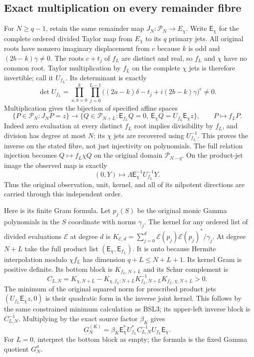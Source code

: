 \documentclass[11pt,a4paper]{article}
\begin{document}
\subsection{Exact multiplication on every remainder fibre}
For $N\geq q-1$, retain the same remainder map
$J_N:\mathcal P_N\to E_\chi$. Write $\mathsf E_\chi$ for the complete
ordered divided Taylor map from $E_\chi$ to its $q$ primary jets.
All original roots have nonzero imaginary displacement from $c$
because $k$ is odd and $(2b-k)\gamma\ne0$. The roots $c+t_j$ of
$f_L$ are distinct and real, so $f_L$ and $\chi$ have no common root.
Taylor multiplication by $f_L$ on the complete $\chi$ jets is therefore
invertible; call it $U_{f_L}$. Its determinant is exactly
\[
 \det U_{f_L}=\prod_{a,b=0}^{k}\prod_{j=0}^{L-1}
 \big((2a-k)\delta-t_j+i(2b-k)\gamma\big)^e\ne0.
 \tag{IKO6}
\]
Multiplication gives the bijection of specified affine spaces
\[
 \{P\in\mathcal P_N:J_NP=z\}\longrightarrow
 \{Q\in\mathcal P_{N+L}:\mathsf E_{f_L}Q=0,
                \ \mathsf E_\chi Q=U_{f_L}\mathsf E_\chi z\},
 \qquad P\longmapsto f_LP.
 \tag{IKO7}
\]
Indeed zero evaluation at every distinct $f_L$ root implies
divisibility by $f_L$, and division has degree at most $N$; its
$\chi$ jets are recovered using $U_{f_L}^{-1}$. This proves the
inverse on the stated fibre, not just injectivity on polynomials.
The full relation injection becomes
$Q\mapsto f_L\chi Q$ on the original domain $\mathcal P_{N-q}$.
On the product-jet image the observed map is exactly
\[
 (0,Y)\longmapsto\Lambda\mathsf E_\chi^{-1}U_{f_L}^{-1}Y.
 \tag{IKO8}
\]
Thus the original observation, unit, kernel, and all of its nilpotent
directions are carried through this independent order.

Here is its finite Gram formula. Let $p_j(S)$ be the original monic
Gamma polynomials in the $S$ coordinate with norms $\gamma_j$.
The kernel for any ordered list of divided evaluations $\mathcal E$
at degree $d$ is
$K_{\mathcal E,d}=\sum_{j=0}^d
\mathcal E(p_j)\mathcal E(p_j)^*/\gamma_j$.
At degree $N+L$ take the full product list $(\mathsf E_\chi,
\mathsf E_{f_L})$. It is onto because Hermite interpolation modulo
$\chi f_L$ has dimension $q+L\leq N+L+1$. Its kernel Gram is
positive definite. Its bottom block is $K_{f_L,N+L}$ and its Schur
complement is
\[
 C_{L,N}=K_{\chi,N+L}-K_{\chi,f_L;N+L}
 K_{f_L,N+L}^{-1}K_{f_L,\chi;N+L}>0.
\]
The minimum of the original squared norm for prescribed product jets
$(U_{f_L}\mathsf E_\chi z,0)$ is their quadratic form in the inverse
joint kernel. This follows by the same constrained minimum calculation
as BSL3; its upper-left inverse block is $C_{L,N}^{-1}$.
Multiplying by the exact source factor $\beta_K$ gives
\[
 G_N^{(K)}=\beta_K\mathsf E_\chi^*U_{f_L}^*
                       C_{L,N}^{-1}U_{f_L}\mathsf E_\chi.
 \tag{IKO9}
\]
For $L=0$, interpret the bottom block as empty; the formula is the
fixed Gamma quotient $G_N^\sigma$.
\end{document}
